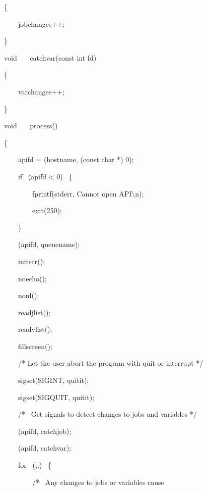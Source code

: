 \begin{exparasmall}
\{

\ \ \ \ jobchanges++;

\}

\bigskip


void \ \ \ catchvar(const int fd)

\{

\ \ \ \ varchanges++;

\}

\bigskip


void \ \ \ process()

\{

\ \ \ \ apifd = \funcnameXBopen{}(hostname, (const char *) 0);

\ \ \ \ if \ (apifd {\textless} 0) \ \{

\ \ \ \ \ \ \ \ fprintf(stderr, {\textquotedbl}Cannot open
API{\textbackslash}n{\textquotedbl});

\ \ \ \ \ \ \ \ exit(250);

\ \ \ \ \}

\bigskip


\ \ \ \ \funcnameXBsetqueue{}(apifd, queuename);

\bigskip


\ \ \ \ initscr();

\ \ \ \ noecho();

\ \ \ \ nonl();

\bigskip


\ \ \ \ readjlist();

\ \ \ \ readvlist();

\ \ \ \ fillscreen();

\bigskip


\ \ \ \ /* Let the user abort the program with quit or interrupt */

\bigskip


\ \ \ \ sigset(SIGINT, quitit);

\ \ \ \ sigset(SIGQUIT, quitit);

\bigskip


\ \ \ \ /* \ Get signals to detect changes to jobs and variables */

\bigskip


\ \ \ \ \funcnameXBjobmon{}(apifd, catchjob);

\ \ \ \ \funcnameXBvarmon{}(apifd, catchvar);

\bigskip


\ \ \ \ for \ (;;) \ \{

\bigskip


\ \ \ \ \ \ \ \ /* \ Any changes to jobs or variables cause


\end{exparasmall}

